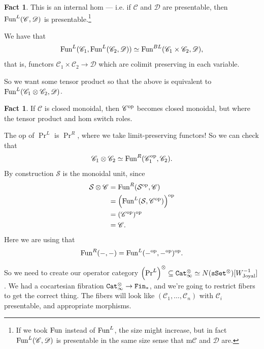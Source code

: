 \documentclass[12pt]{amsart}
\theoremstyle{definition}
\newtheorem{fact}[theorem]{Fact}
\begin{document}
\begin{fact} This is an internal hom --- i.e. if $\mathscr{C}$ and $\mathscr{D}$ are presentable, then $\text{Fun}^L(\mathscr{C},\mathscr{D})$ is presentable.\footnote{If we took $\text{Fun}$ instead of $\text{Fun}^L$, the size might increase, but in fact $\text{Fun}^L(\mathscr{C},\mathscr{D})$ is presentable in the same size sense that m$\mathscr{C}$ and $\mathscr{D}$ are.}
\end{fact}

We have that
\begin{align*}
    \text{Fun}^L(\mathscr{C}_1, \text{Fun}^L(\mathscr{C}_2, \mathscr{D})) \simeq \text{Fun}^{BL}(\mathscr{C}_1 \times \mathscr{C}_2, \mathscr{D}),
\end{align*}
that is, functors $\mathscr{C}_1 \times \mathscr{C}_2 \to \mathscr{D}$ which are colimit preserving in each variable.

So we want some tensor product so that the above is equivalent to $\text{Fun}^L(\mathscr{C}_1 \otimes \mathscr{C}_2, \mathscr{D})$.

\begin{fact} If $\mathscr{C}$ is closed monoidal, then $\mathscr{C}^{\text{op}}$ becomes closed monoidal, but where the tensor product and hom switch roles.
\end{fact}

The op of $\Pr^L$ is $\Pr^R$, where we take limit-preserving functors! So we can check that
\begin{align*}
    \mathscr{C}_1 \otimes \mathscr{C}_2 \simeq \text{Fun}^R(\mathscr{C}_1^{\text{op}},\mathscr{C}_2).
\end{align*}
By construction $\mathcal{S}$ is the monoidal unit, since
\begin{align*}
    \mathcal{S} \otimes \mathscr{C} &= \text{Fun}^R(\mathcal{S}^{\text{op}}, \mathscr{C}) \\
    &= \left( \text{Fun}^L(\mathcal{S}, \mathscr{C}^{\text{op}}) \right)^{\text{op}} \\
    &= (\mathscr{C}^{\text{op}})^{\text{op}} \\
    &= \mathscr{C}.
\end{align*}
Here we are using that
\begin{align*}
    \text{Fun}^R(-,-) = \text{Fun}^L(-^{\text{op}},-^{\text{op}})^{\text{op}}.
\end{align*}

So we need to create our operator category $\left( \Pr^L \right)^\otimes \subseteq \texttt{Cat}_\infty^\otimes \simeq N(\texttt{sSet}^\otimes)[W_\text{Joyal}^{-1}]$. We had a cocartesian fibration $\texttt{Cat}_\infty^\otimes \to \texttt{Fin}_\ast$, and we're going to restrict fibers to get the correct thing. The fibers will look like $(\mathscr{C}_1, \ldots, \mathscr{C}_n)$ with $\mathscr{C}_i$ presentable, and appropriate morphisms.
\end{document}

